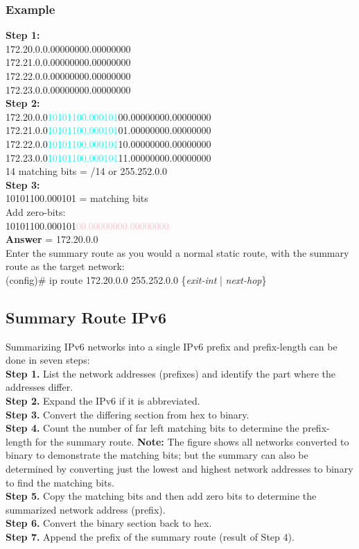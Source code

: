 \subsubsection*{Example}
\textrm{\textbf{Step 1:}}\\
172.20.0.0.00000000.00000000\\
172.21.0.0.00000000.00000000\\
172.22.0.0.00000000.00000000\\
172.23.0.0.00000000.00000000\\
\textrm{\textbf{Step 2:}}\\
172.20.0.0\qquad \textcolor{cyan}{10101100.000101}00.00000000.00000000\\
172.21.0.0\qquad \textcolor{cyan}{10101100.000101}01.00000000.00000000\\
172.22.0.0\qquad \textcolor{cyan}{10101100.000101}10.00000000.00000000\\
172.23.0.0\qquad \textcolor{cyan}{10101100.000101}11.00000000.00000000\\
\textrm{14 matching bits = /14 or 255.252.0.0\\\textbf{Step 3:}}\\
10101100.000101 \textrm{= matching bits\\Add zero-bits:}\\
10101100.000101\textcolor{pink}{00.00000000.00000000}\\
\textrm{\textbf{Answer} = 172.20.0.0\\Enter the summary route as you would a normal static route, with the summary route as the target network:}\\
(config)\# ip route 172.20.0.0 255.252.0.0 \{\textit{exit-int} | \textit{next-hop}\}

\subsection{Summary Route IPv6}
\textrm{Summarizing IPv6 networks into a single IPv6 prefix and prefix-length can be done in seven steps:\\
\textbf{Step 1.} List the network addresses (prefixes) and identify the part where the addresses differ.\\
\textbf{Step 2.} Expand the IPv6 if it is abbreviated.\\
\textbf{Step 3.} Convert the differing section from hex to binary.\\
\textbf{Step 4.} Count the number of far left matching bits to determine the prefix-length for the summary route. \textbf{Note:} The figure shows all networks converted to binary to demonstrate the matching bits; but the summary can also be determined by converting just the lowest and highest network addresses to binary to find the matching bits.\\
\textbf{Step 5.} Copy the matching bits and then add zero bits to determine the summarized network address (prefix).\\
\textbf{Step 6.} Convert the binary section back to hex.\\
\textbf{Step 7.} Append the prefix of the summary route (result of Step 4).
}

